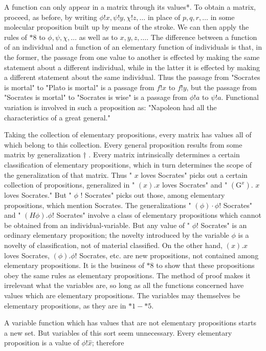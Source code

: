 \documentclass[10pt]{article}
\begin{document}
A function can only appear in a matrix through its values*. To obtain a matrix, proceed, as before, by writing $\phi!x, \psi!y, \chi!z, \ldots$ in place of $p, q, r, \ldots$ in some molecular proposition built up by means of the stroke. We can then apply the rules of $* 8$ to $\phi, \psi, \chi, \ldots$ as well as to $x, y, z, \ldots$. The difference between a function of an individual and a function of an elementary function of individuals is that, in the former, the passage from one value to another is effected by making the same statement about a different individual, while in the latter it is effected by making a different statement about the same individual. Thus the passage from "Socrates is mortal" to "Plato is mortal" is a passage from $f!x$ to $f!y$, but the passage from "Socrates is mortal" to "Socrates is wise" is a passage from $\phi!a$ to $\psi!a$. Functional variation is involved in such a proposition as: "Napoleon had all the characteristics of a great general."

Taking the collection of elementary propositions, every matrix has values all of which belong to this collection. Every general proposition results from some matrix by generalization † . Every matrix intrinsically determines a certain classification of elementary propositions, which in turn determines the scope of the generalization of that matrix. Thus " $x$ loves Socrates" picks out a certain collection of propositions, generalized in " $(x) . x$ loves Socrates" and " $\left(\mathrm{G}^{x}\right)$. $x$ loves Socrates." But " $\phi$ ! Socrates" picks out those, among elementary propositions, which mention Socrates. The generalizations " $(\phi) \cdot \phi!$ Socrates" and " $(H \phi) . \phi!$ Socrates" involve a class of elementary propositions which cannot be obtained from an individual-variable. But any value of " $\phi!$ Socrates" is an ordinary elementary proposition; the novelty introduced by the variable $\phi$ is a novelty of classification, not of material classified. On the other hand, $(x) . x$ loves Socrates, $(\phi) . \phi!$ Socrates, etc. are new propositions, not contained among elementary propositions. It is the business of $* 8$ to show that these propositions obey the same rules as elementary propositions. The method of proof makes it irrelevant what the variables are, so long as all the functions concerned have values which are elementary propositions. The variables may themselves be elementary propositions, as they are in $* 1-* 5$.

A variable function which has values that are not elementary propositions starts a new set. But variables of this sort seem unnecessary. Every elementary proposition is a value of $\phi!\hat{x}$; therefore
\end{document}
